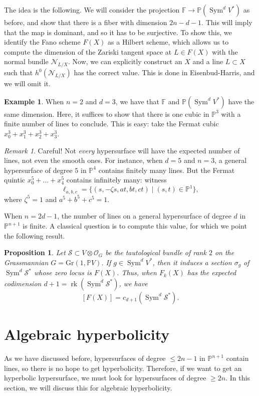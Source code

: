 \documentclass[leqno, openany]{memoir}
\newtheorem{prop}[thm]{Proposition}
\theoremstyle{definition}
\newtheorem{exm}[thm]{Example}
\theoremstyle{remark}
\newtheorem{rmk}[thm]{Remark}
\theoremstyle{plain}
\theoremstyle{definition}
\theoremstyle{remark}
\newcommand{\Gr}{\mathrm{Gr}}
\newcommand{\F}{\mathbb{F}}
\renewcommand{\P}{\mathbb{P}}
\newcommand{\mc}[1]{\mathcal{#1}}
\DeclareMathOperator{\rk}{rk}
\DeclareMathOperator{\Sym}{Sym}
\begin{document}
The idea is the following. We will consider the projection $\F\to \P(\Sym^d V^\ast)$ as before, and show that there is a fiber with dimension $2n-d-1$. This will imply that the map is dominant, and so it has to be surjective. To show this, we identify the Fano scheme $F(X)$ as a Hilbert scheme, which allows us to compute the dimension of the Zariski tangent space at $L \in F(X)$ with the normal bundle $\mc{N}_{L/X}$. Now, we can explicitly construct an $X$ and a line $L \subset X$ such that $h^0(\mc{N}_{L/X})$ has the correct value. This is done in Eisenbud-Harris, and we will omit it.

\begin{exm}
When $n=2$ and $d=3$, we have that $\F$ and $\P(\Sym^d V^\ast)$ have the same dimension. Here, it suffices to show that there is one cubic in $\P^3$ with a finite number of lines to conclude. This is easy: take the Fermat cubic $x_0^3+x_1^3+x_2^3+x_3^3$. 
\end{exm}

\begin{rmk}
Careful! Not \textit{every} hypersurface will have the expected number of lines, not even the smooth ones. For instance, when $d=5$ and $n=3$, a general hypersurface of degree $5$ in $\P^4$ contains finitely many lines. But the Fermat quintic $x_0^5+\dots+x_4^5$ contains infinitely many: witness
\[ \ell_{a, b, c} = \{(s, -\zeta s, at, bt, ct) \mid (s, t) \in \P^1 \}, \]
where $\zeta^5=1$ and $a^5+b^5+c^5=1$. 
\end{rmk}

When $n=2d-1$, the number of lines on a general hypersurface of degree $d$ in $\P^{n+1}$ is finite. A classical question is to compute this value, for which we point the following result. 

\begin{prop}
    Let $\mc{S} \subset V \otimes \mc{O}_G$ be the tautological bundle of rank $2$ on the Grassmannian $G=\Gr(1, \P V)$. If $g \in \Sym^d V^\ast$, then it induces a section $\sigma_g$ of $\Sym^d \mc{S}^\ast$ whose zero locus is $F(X)$. Thus, when $F_k(X)$ has the expected codimension $d+1=\rk(\Sym^d \mc{S}^\ast)$, we have
\[ [F(X)] = c_{d+1}(\Sym^d \mc{S}^\ast). \]
\end{prop}

\section{Algebraic hyperbolicity} \label{sec:alghyp}

As we have discussed before, hypersurfaces of degree $\leq 2n-1$ in $\P^{n+1}$ contain lines, so there is no hope to get hyperbolicity. Therefore, if we want to get an hyperbolic hypersurface, we must look for hypersurfaces of degree $\geq 2n$. In this section, we will discuss this for algebraic hyperbolicity.
\end{document}
